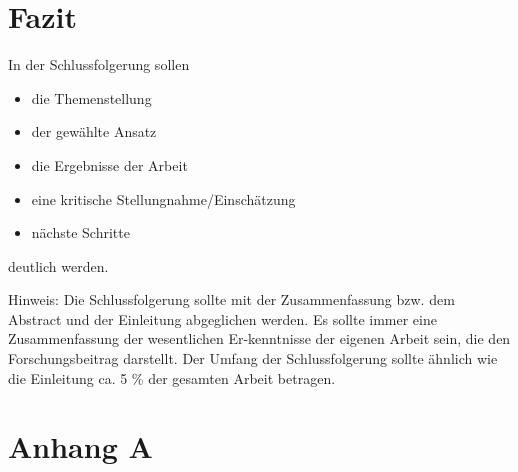 \section{Fazit}
In der Schlussfolgerung sollen

\begin{itemize}
\item die Themenstellung
\item der gewählte Ansatz
\item die Ergebnisse der Arbeit
\item eine kritische Stellungnahme/Einschätzung
\item nächste Schritte
\end{itemize}
deutlich werden.

Hinweis:
Die Schlussfolgerung sollte mit der Zusammenfassung bzw. dem Abstract und der Einleitung abgeglichen werden. Es sollte immer eine Zusammenfassung der wesentlichen Er-kenntnisse der eigenen Arbeit sein, die den Forschungsbeitrag darstellt. Der Umfang der Schlussfolgerung sollte ähnlich wie die Einleitung ca. 5 \% der gesamten Arbeit betragen.


\clearpage
\lhead{}
\printbibliography
{}


\clearpage
\appendix
\section{Anhang A} %





\clearemptydoublepage




